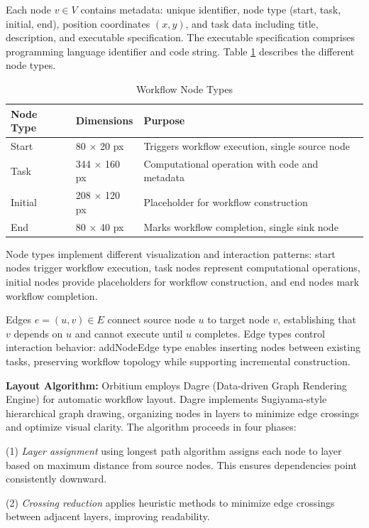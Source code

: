 \documentclass[12pt]{article}
\begin{document}
Each node $v \in V$ contains metadata: unique identifier, node type (start, task, initial, end), position coordinates $(x, y)$, and task data including title, description, and executable specification. The executable specification comprises programming language identifier and code string. Table \ref{tab:node_types} describes the different node types.

\begin{table}[h]
\centering
\caption{Workflow Node Types}
\label{tab:node_types}
\begin{tabular}{|l|l|p{6cm}|}
\hline
\textbf{Node Type} & \textbf{Dimensions} & \textbf{Purpose} \\
\hline
Start & 80 × 20 px & Triggers workflow execution, single source node \\
Task & 344 × 160 px & Computational operation with code and metadata \\
Initial & 208 × 120 px & Placeholder for workflow construction \\
End & 80 × 40 px & Marks workflow completion, single sink node \\
\hline
\end{tabular}
\end{table}

Node types implement different visualization and interaction patterns: start nodes trigger workflow execution, task nodes represent computational operations, initial nodes provide placeholders for workflow construction, and end nodes mark workflow completion.

Edges $e = (u, v) \in E$ connect source node $u$ to target node $v$, establishing that $v$ depends on $u$ and cannot execute until $u$ completes. Edge types control interaction behavior: addNodeEdge type enables inserting nodes between existing tasks, preserving workflow topology while supporting incremental construction.

\hspace{\parindent}\textbf{Layout Algorithm:} Orbitium employs Dagre (Data-driven Graph Rendering Engine) for automatic workflow layout. Dagre implements Sugiyama-style hierarchical graph drawing, organizing nodes in layers to minimize edge crossings and optimize visual clarity. The algorithm proceeds in four phases: 

(1) \textit{Layer assignment} using longest path algorithm assigns each node to layer based on maximum distance from source nodes. This ensures dependencies point consistently downward.

(2) \textit{Crossing reduction} applies heuristic methods to minimize edge crossings between adjacent layers, improving readability.
\end{document}
